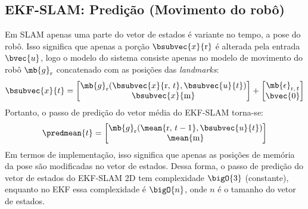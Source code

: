 \subsection{EKF-SLAM: Predição (Movimento do robô)}
\label{sec:ekf-slam-prediction}
Em SLAM apenas uma parte do vetor de estados é variante no tempo, a pose do 
robô. Isso significa que apenas a porção $\bsubvec{x}{\mathrm{r}}$ é alterada pela entrada $\bvec{u}$, logo o modelo do sistema consiste apenas no modelo de 
movimento do robô $\mb{g}_\mathrm{r}$ concatenado com as posições das \textit{landmarks}:
\begin{equation}
  \bsubvec{x}{t} = \begin{bmatrix}
    \mb{g}_\mathrm{r}(\bsubvec{x}{\mathrm{r}, \,t}, \bsubvec{u}{t}) \\
    \bsubvec{x}{\mathrm{m}}
  \end{bmatrix} + \begin{bmatrix} 
      \mb{\epsilon}_{\mathrm{r}, \,t} \\
      \bvec{0}
  \end{bmatrix}
  \label{eq:slam-prediction}
\end{equation}
Portanto, o passo de predição do vetor média do EKF-SLAM torna-se:
\begin{equation}
  \predmean{t} = \begin{bmatrix}
    \mb{g}_\mathrm{r}(\mean{\mathrm{r}, \,t-1}, \bsubvec{u}{t}) \\
      \mean{\mathrm{m}}
  \end{bmatrix}
\end{equation}
Em termos de implementação, isso significa que apenas as posições de memória da 
pose são modificadas no vetor de estados. Dessa forma, o passo de predição do 
vetor de estados do EKF-SLAM 2D tem complexidade $\bigO{3}$ (constante), enquanto no EKF 
essa complexidade é $\bigO{n}$, onde $n$ é o tamanho do vetor de estados.


